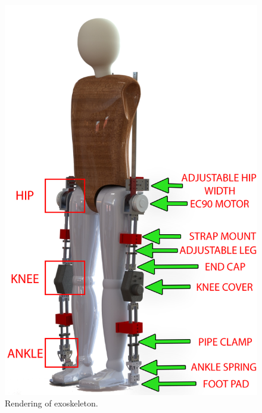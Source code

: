 \begin{figure}[h!]
    \centering
    \includegraphics[scale=0.25]{images/mech_design/rendering2.png}
    \caption{Rendering of exoskeleton.}
    \label{fig:Render}
\end{figure}

